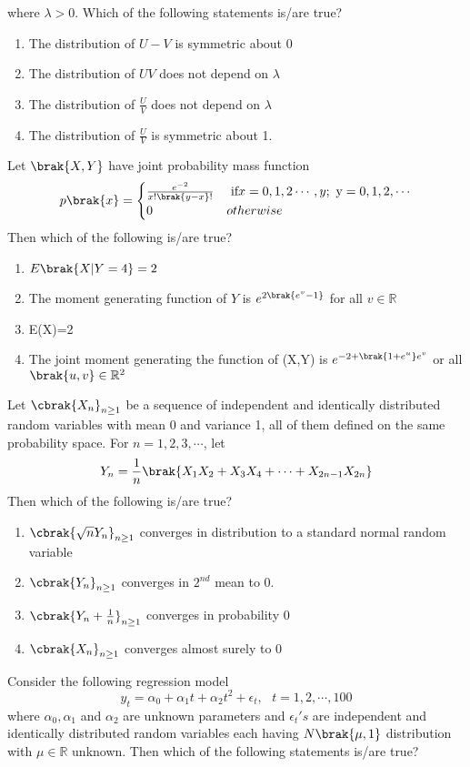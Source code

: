 where $\lambda >0$. Which of the following statements is/are true?
\begin{enumerate}
    \item The distribution of $U-V$ is symmetric about 0
    \item The distribution of $UV$ does not depend on $\lambda$
    \item The distribution of $\frac{U}{V}$ does not depend on $\lambda$
    \item The distribution of $\frac{U}{V}$ is symmetric about 1.
\end{enumerate}
\item Let $\brak{X,Y}$ have joint probability mass function    \[p\brak{x}=
\begin{cases}
    \frac{e^{-2}}{x!\brak{y-x}!} & \text{ if} x=0,1,2\cdots,y; \text{ y}=0,1,2,\cdots\\
    0 & otherwise
\end{cases}
\]
Then which of the following is/are true?
\begin{enumerate}
    \item $E\brak{X|Y=4}=2$
    \item The moment generating function of $Y$ is $e^{2\brak{e^v-1}}$ for all $v \in \mathbb{R}$
    \item E(X)=2
    \item The joint moment generating the function of (X,Y) is $e^{-2+\brak{1+e^u}e^v}$ or all $\brak{u,v}\in \mathbb{R}^2$
    
\end{enumerate}
\item Let $\cbrak{X_n}_{n\geq1}$ be a sequence of independent and identically distributed random variables with mean 0 and variance 1, all of them defined on the same probability space. For $n=1,2,3,\cdots$, let 
$$Y_n=\frac{1}{n}\brak{X_1X_2+X_3X_4+\cdots+X_{2n-1}X_{2n}}$$ Then which of the following is/are true?
\begin{enumerate}
    \item $\cbrak{\sqrt{n}Y_n}_{n\geq1}$ converges in distribution to a standard normal random variable
    \item $\cbrak{Y_n}_{n\geq1}$ converges in $2^{nd}$ mean to 0.
    \item $\cbrak{Y_n+\frac{1}{n}}_{n\geq1}$ converges in probability 0
    \item $\cbrak{X_n}_{n\geq 1}$ converges almost surely to 0
\end{enumerate}
\item Consider the following regression model $$y_t=\alpha_0+\alpha_1t+\alpha_2t^2+\epsilon_t, \text{ } t=1,2,\cdots,100$$ where $\alpha_0,\alpha_1$ and $\alpha_2$ are unknown parameters and $\epsilon_t's$ are independent and identically distributed random variables each having $N\brak{\mu,1}$ distribution with $\mu \in \mathbb{R}$ unknown. Then which of the following statements is/are true?
